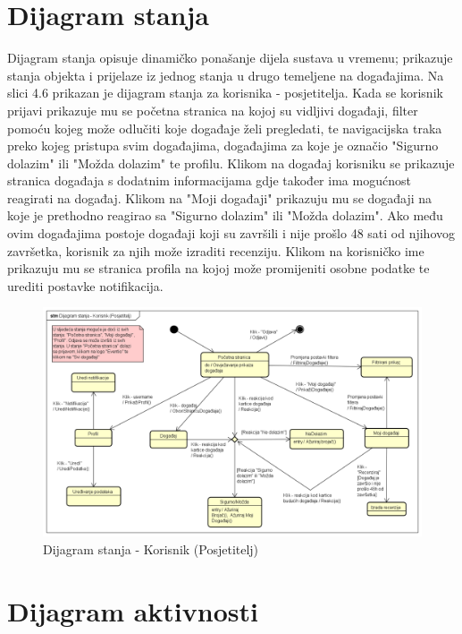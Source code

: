 			
			\eject
		
		\section{Dijagram stanja}
			
			
			Dijagram stanja opisuje dinamičko ponašanje dijela sustava u vremenu; prikazuje stanja objekta i prijelaze iz jednog stanja u drugo temeljene na događajima. Na slici 4.6 prikazan je dijagram stanja za korisnika - posjetitelja. Kada se korisnik prijavi prikazuje mu se početna stranica na kojoj su vidljivi događaji, filter pomoću kojeg može odlučiti koje događaje želi pregledati, te navigacijska traka preko kojeg pristupa svim događajima, događajima za koje je označio "Sigurno dolazim" ili "Možda dolazim" te profilu. Klikom na događaj korisniku se prikazuje stranica događaja s dodatnim informacijama gdje također ima mogućnost reagirati na događaj. Klikom na "Moji događaji" prikazuju mu se događaji na koje je prethodno reagirao sa "Sigurno dolazim" ili "Možda dolazim". Ako među ovim događajima postoje događaji koji su završili i nije prošlo 48 sati od njihovog završetka, korisnik za njih može izraditi recenziju. Klikom na korisničko ime prikazuju mu se stranica profila na kojoj može promijeniti osobne podatke te urediti postavke notifikacija.
			
			\begin{figure}[H]
			\includegraphics[scale=0.48]{dijagrami/DijagramStanja-Korisnik.png}
			\centering
			\caption{Dijagram stanja - Korisnik (Posjetitelj)}
			\label{fig:promjene}
			\end{figure}
			
			\eject 
		
		\section{Dijagram aktivnosti}
			
